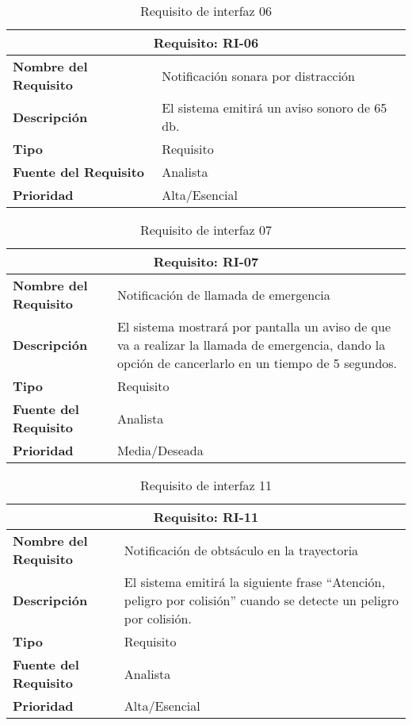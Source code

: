 \begin{table}[H]
\begin{center}
\begin{tabular}{p{} p{7cm}}
\multicolumn{2}{c}{\textbf{Requisito: RI-06} } \\
\hline \hline
\textbf{Nombre del Requisito} & Notificación sonara por distracción\\
\hline
\textbf{Descripción} & El sistema emitirá un aviso sonoro de 65 db. \\
\hline
\textbf{Tipo} & Requisito  \\
\hline
\textbf{Fuente del Requisito} & Analista \\
\hline
\textbf{Prioridad} & Alta/Esencial  \\ \hline
\end{tabular}
\caption{Requisito de interfaz 06}
\label{tab:RI-06}
\end{center}
\end{table}

\begin{table}[H]
\begin{center}
\begin{tabular}{p{} p{7cm}}
\multicolumn{2}{c}{\textbf{Requisito: RI-07} } \\
\hline \hline
\textbf{Nombre del Requisito} & Notificación de llamada de emergencia\\
\hline
\textbf{Descripción} & El sistema mostrará por pantalla un aviso de que va a realizar la llamada de emergencia, dando la opción de cancerlarlo en un tiempo de 5 segundos. \\
\hline
\textbf{Tipo} & Requisito  \\
\hline
\textbf{Fuente del Requisito} & Analista \\
\hline
\textbf{Prioridad} & Media/Deseada  \\ \hline
\end{tabular}
\caption{Requisito de interfaz 07}
\label{tab:RI-07}
\end{center}
\end{table}

\begin{table}[H]
\begin{center}
\begin{tabular}{p{} p{7cm}}
\multicolumn{2}{c}{\textbf{Requisito: RI-11} } \\
\hline \hline
\textbf{Nombre del Requisito} & Notificación de obtsáculo en la trayectoria\\
\hline
\textbf{Descripción} & El sistema emitirá la siguiente frase ``Atención, peligro por colisión'' cuando se detecte un peligro por colisión. \\
\hline
\textbf{Tipo} & Requisito  \\
\hline
\textbf{Fuente del Requisito} & Analista  \\
\hline
\textbf{Prioridad} & Alta/Esencial \\ \hline
\end{tabular}
\caption{Requisito de interfaz 11}
\label{tab:RI-11}
\end{center}
\end{table}

